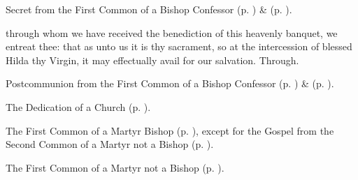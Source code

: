 \begin{rubric}
	 Secret  from the First Common of a Bishop Confessor (p. \pageref{CommonConfessorBishopISecret}) \&   (p. \pageref{SPSaints}).
\end{rubric}

\postcommunion
{} through whom we have received the benediction of this heavenly banquet, we entreat thee: that as unto us it is thy sacrament, so at the intercession of blessed Hilda thy Virgin, it may effectually avail for our salvation. Through.

\begin{rubric}
	 Postcommunion  from the First Common of a Bishop Confessor (p. \pageref{CommonConfessorBishopIPostcommunion}) \&   (p. \pageref{SPSaints}).
\end{rubric}



\begin{rubric}
	The Dedication of a Church (p. \pageref{CommonDedication}).
\end{rubric}



\begin{rubric}
	The First Common of a Martyr Bishop (p. \pageref{CommonMartyrBishopI}), except for the Gospel from the Second Common of a Martyr not a Bishop (p. \pageref{CommonMartyrNotBishopII}).
\end{rubric}


\clearpage
{}

\begin{rubric}
	The First Common of a Martyr not a Bishop (p. \pageref{CommonMartyrNotBishopI}).
\end{rubric}

\vspace{-0.2\baselineskip}

\collect

\vspace{-0.1\baselineskip}

